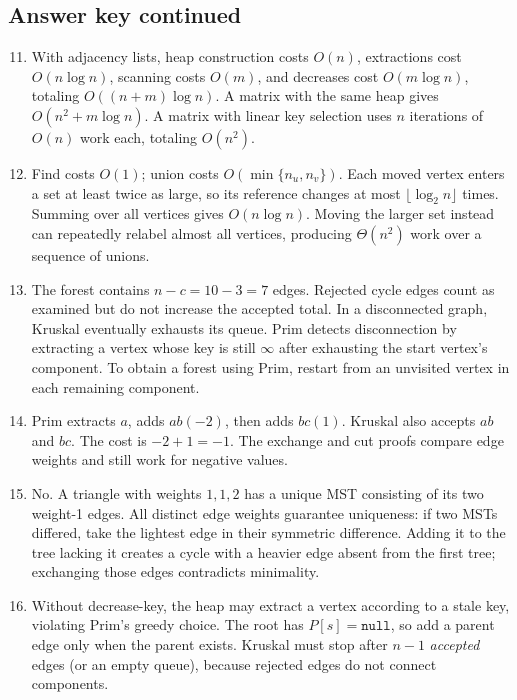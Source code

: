 \documentclass[11pt,letterpaper]{article}
\begin{document}
\subsection*{Answer key continued}
\begin{enumerate}\setcounter{enumi}{10}
 \item With adjacency lists, heap construction costs $O(n)$, extractions cost $O(n\log n)$, scanning costs $O(m)$, and decreases cost $O(m\log n)$, totaling $O((n+m)\log n)$. A matrix with the same heap gives $O(n^2+m\log n)$. A matrix with linear key selection uses $n$ iterations of $O(n)$ work each, totaling $O(n^2)$.
 \item Find costs $O(1)$; union costs $O(\min\{n_u,n_v\})$. Each moved vertex enters a set at least twice as large, so its reference changes at most $\lfloor\log_2 n\rfloor$ times. Summing over all vertices gives $O(n\log n)$. Moving the larger set instead can repeatedly relabel almost all vertices, producing $\Theta(n^2)$ work over a sequence of unions.
 \item The forest contains $n-c=10-3=7$ edges. Rejected cycle edges count as examined but do not increase the accepted total. In a disconnected graph, Kruskal eventually exhausts its queue. Prim detects disconnection by extracting a vertex whose key is still $\infty$ after exhausting the start vertex's component. To obtain a forest using Prim, restart from an unvisited vertex in each remaining component.
 \item Prim extracts $a$, adds $ab(-2)$, then adds $bc(1)$. Kruskal also accepts $ab$ and $bc$. The cost is $-2+1=\boxed{-1}$. The exchange and cut proofs compare edge weights and still work for negative values.
 \item No. A triangle with weights $1,1,2$ has a unique MST consisting of its two weight-1 edges. All distinct edge weights guarantee uniqueness: if two MSTs differed, take the lightest edge in their symmetric difference. Adding it to the tree lacking it creates a cycle with a heavier edge absent from the first tree; exchanging those edges contradicts minimality.
 \item Without decrease-key, the heap may extract a vertex according to a stale key, violating Prim's greedy choice. The root has $P[s]=\texttt{null}$, so add a parent edge only when the parent exists. Kruskal must stop after $n-1$ \emph{accepted} edges (or an empty queue), because rejected edges do not connect components.
\end{enumerate}
\end{document}
